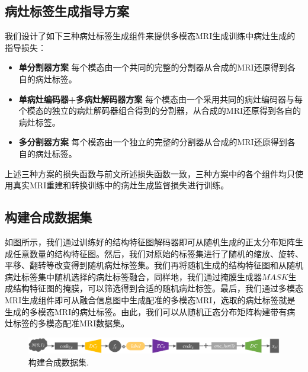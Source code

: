 \documentclass[letterpaper]{article} %
\begin{document}
\subsection{病灶标签生成指导方案}
\label{label gen methods}
我们设计了如下三种病灶标签生成组件来提供多模态MRI生成训练中病灶生成的指导损失：
\begin{itemize}
	\item \textbf{单分割器方案} 
	每个模态由一个共同的完整的分割器从合成的MRI还原得到各自的病灶标签。
	\item \textbf{单病灶编码器+多病灶解码器方案} 
	每个模态由一个采用共同的病灶编码器与每个模态的独立的病灶解码器组合得到的分割器，从合成的MRI还原得到各自的病灶标签。
	\item \textbf{多分割器方案} 
	每个模态由一个独立的完整的分割器从合成的MRI还原得到各自的病灶标签。
\end{itemize}
上述三种方案的损失函数与前文所述损失函数一致，三种方案中的各个组件均只使用真实MRI重建和转换训练中的病灶生成监督损失进行训练。

\subsection{构建合成数据集}
\label{make dataset}
如图所示，我们通过训练好的结构特征图解码器即可从随机生成的正太分布矩阵生成任意数量的结构特征图。然后，我们对原始的标签集进行了随机的缩放、旋转、平移、翻转等改变得到随机病灶标签集。我们再将随机生成的结构特征图和从随机病灶标签集中随机选择的病灶标签融合，同样地，我们通过掩膜生成器$MASK$生成结构特征图的掩膜，可以筛选得到合适的随机病灶标签。最后，我们通过多模态MRI生成组件即可从融合信息图中生成配准的多模态MRI，选取的病灶标签就是生成的多模态MRI的病灶标签。由此，我们可以从随机正态分布矩阵构建带有病灶标签的多模态配准MRI数据集。
\begin{figure}
	\centering
	\includegraphics[width=0.98\columnwidth]{figures/make_data}
	\caption{构建合成数据集.}
	\label{make_data}
\end{figure}
\end{document}
